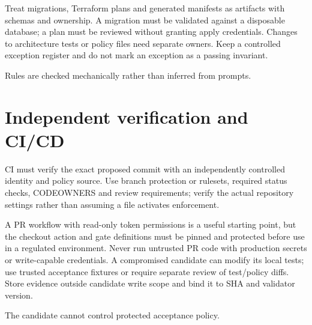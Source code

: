 \documentclass[11pt,letterpaper]{article}
\begin{document}
Treat migrations, Terraform plans and generated manifests as artifacts with schemas and ownership. A migration must be validated against a disposable database; a plan must be reviewed without granting apply credentials. Changes to architecture tests or policy files need separate owners. Keep a controlled exception register and do not mark an exception as a passing invariant.

\begin{center}\begin{minipage}{\linewidth}\captionsetup{type=figure}\centering{}\caption{Architectural invariant enforcement}
\small Rules are checked mechanically rather than inferred from prompts.\end{minipage}\end{center}
\section{Independent verification and CI/CD}
CI must verify the exact proposed commit with an independently controlled identity and policy source. Use branch protection or rulesets, required status checks, CODEOWNERS and review requirements; verify the actual repository settings rather than assuming a file activates enforcement. \cite{github}

A PR workflow with read-only token permissions is a useful starting point, but the checkout action and gate definitions must be pinned and protected before use in a regulated environment. Never run untrusted PR code with production secrets or write-capable credentials. A compromised candidate can modify its local tests; use trusted acceptance fixtures or require separate review of test/policy diffs. Store evidence outside candidate write scope and bind it to SHA and validator version.

\begin{center}\begin{minipage}{\linewidth}\captionsetup{type=figure}\centering{}\caption{Independent CI verification}
\small The candidate cannot control protected acceptance policy.\end{minipage}\end{center}
\end{document}
